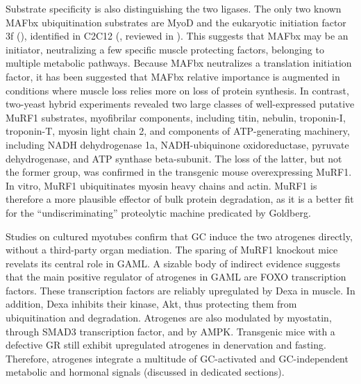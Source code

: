 \documentclass[12pt,english]{report}\usepackage[]{graphicx}\usepackage[]{color}
\begin{document}
Substrate specificity is also distinguishing the two ligases. The
only two known MAFbx ubiquitination substrates are MyoD and the eukaryotic
initiation factor 3f (),
identified in C2C12 (\citep{tintignac2005degradation,lagirand-cantaloube2008initiation},
reviewed in \citep{bodine2014skeletal}). This suggests that MAFbx
may be an initiator, neutralizing a few specific muscle protecting
factors, belonging to multiple metabolic pathways. Because MAFbx neutralizes
a translation initiation factor, it has been suggested that MAFbx
relative importance is augmented in conditions where muscle loss relies
more on loss of protein synthesis. In contrast, two-yeast hybrid experiments
revealed two large classes of well-expressed putative MuRF1 substrates,
myofibrilar components, including titin, nebulin, troponin-I, troponin-T,
myosin light chain 2, and components of ATP-generating machinery,
including NADH dehydrogenase 1a, NADH-ubiquinone oxidoreductase, pyruvate
dehydrogenase, and ATP synthase beta-subunit\citep{witt2005murf-1}.
The loss of the latter, but not the former group, was confirmed in
the transgenic mouse overexpressing MuRF1\citep{hirner2008murf1-dependent}.
In vitro, MuRF1 ubiquitinates myosin heavy chains\citep{clarke2007e3}
and actin\citep{polge2011muscle}. MuRF1 is therefore a more plausible
effector of bulk protein degradation, as it is a better fit for the
``undiscriminating'' proteolytic machine predicated by Goldberg.

Studies on cultured myotubes confirm that GC induce the two atrogenes
directly, without a third-party organ mediation\citep{stitt2004igf-1/pi3k/akt}.
The sparing of MuRF1 knockout mice revelats its central role in GAML\citep{baehr2011muscle}.
A sizable body of indirect evidence suggests that the main positive
regulator of atrogenes in GAML are FOXO transcription factors. These
transcription factors are reliably upregulated by Dexa in muscle.
In addition, Dexa inhibits their kinase, Akt, thus protecting them
from ubiquitination and degradation. Atrogenes are also modulated
by myostatin, through SMAD3 transcription factor, and by AMPK. Transgenic
mice with a defective GR still exhibit upregulated atrogenes in denervation
and fasting. Therefore, atrogenes integrate a multitude of GC-activated
and GC-independent metabolic and hormonal signals (discussed in dedicated
sections).
\end{document}

